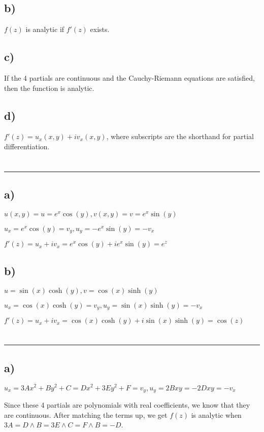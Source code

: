 \documentclass[12pt]{article}
\begin{document}
\subsection{b)}
$f(z)$ is analytic if $f'(z)$ exists.
\subsection{c)}
If the 4 partials are continuous and the Cauchy-Riemann equations are satisfied, then the function is analytic.
\subsection{d)}
$ f'(z) = u_x(x,y) + iv_x(x,y) $, where subscripts are the shorthand for partial differentiation.
\newpage
\section{}\hrule
\subsection{a)}
$ u(x,y) = u = e^x \cos{(y)}, v(x,y) = v = e^x \sin{(y)} $

$u_x = e^x \cos{(y)} = v_y, u_y = -e^x \sin{(y)} = -v_x$

$ f'(z) = u_x + iv_x = e^x\cos{(y)} + ie^x \sin{(y)} = e^z $

\subsection{b)}

$ u = \sin{(x)}\cosh{(y)}, v = \cos{(x)}\sinh{(y)}$

$u_x = \cos{(x)}\cosh{(y)} = v_y, u_y = \sin{(x)}\sinh{(y)} = -v_x$

$ f'(z) = u_x + iv_x = \cos{(x)}\cosh{(y)} + i\sin{(x)}\sinh{(y)} = \cos{(z)} $
\newpage
\section{}\hrule
\subsection{a)}
$ u_x = 3Ax^2 + By^2 + C = Dx^2 + 3Ey^2 + F = v_y, u_y = 2Bxy = -2Dxy = -v_x$

Since these 4 partials are polynomials with real coefficients, we know that they are continuous. After matching the terms up, we get $f(z)$ is analytic when $ 3A = D \land B = 3E \land C = F \land B = -D$.
\end{document}
